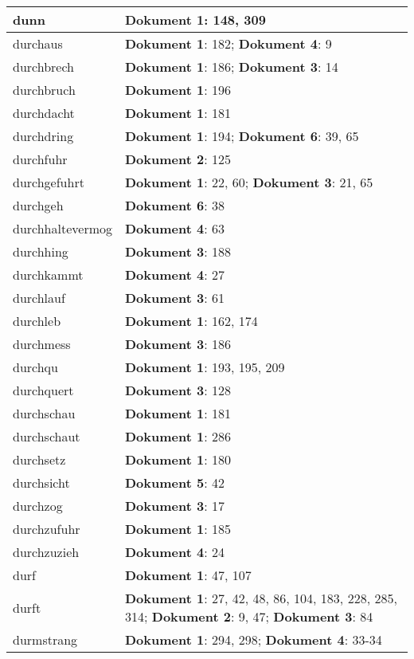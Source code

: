 \documentclass[a5paper]{article}
\begin{document}
\begin{longtable}[l]{|l|p{3in}|}
\hline
dunn & \textbf{Dokument 1}: 148, 309 \\
\hline
durchaus & \textbf{Dokument 1}: 182; \textbf{Dokument 4}: 9 \\
\hline
durchbrech & \textbf{Dokument 1}: 186; \textbf{Dokument 3}: 14 \\
\hline
durchbruch & \textbf{Dokument 1}: 196 \\
\hline
durchdacht & \textbf{Dokument 1}: 181 \\
\hline
durchdring & \textbf{Dokument 1}: 194; \textbf{Dokument 6}: 39, 65 \\
\hline
durchfuhr & \textbf{Dokument 2}: 125 \\
\hline
durchgefuhrt & \textbf{Dokument 1}: 22, 60; \textbf{Dokument 3}: 21, 65 \\
\hline
durchgeh & \textbf{Dokument 6}: 38 \\
\hline
durchhaltevermog & \textbf{Dokument 4}: 63 \\
\hline
durchhing & \textbf{Dokument 3}: 188 \\
\hline
durchkammt & \textbf{Dokument 4}: 27 \\
\hline
durchlauf & \textbf{Dokument 3}: 61 \\
\hline
durchleb & \textbf{Dokument 1}: 162, 174 \\
\hline
durchmess & \textbf{Dokument 3}: 186 \\
\hline
durchqu & \textbf{Dokument 1}: 193, 195, 209 \\
\hline
durchquert & \textbf{Dokument 3}: 128 \\
\hline
durchschau & \textbf{Dokument 1}: 181 \\
\hline
durchschaut & \textbf{Dokument 1}: 286 \\
\hline
durchsetz & \textbf{Dokument 1}: 180 \\
\hline
durchsicht & \textbf{Dokument 5}: 42 \\
\hline
durchzog & \textbf{Dokument 3}: 17 \\
\hline
durchzufuhr & \textbf{Dokument 1}: 185 \\
\hline
durchzuzieh & \textbf{Dokument 4}: 24 \\
\hline
durf & \textbf{Dokument 1}: 47, 107 \\
\hline
durft & \textbf{Dokument 1}: 27, 42, 48, 86, 104, 183, 228, 285, 314; \textbf{Dokument 2}: 9, 47; \textbf{Dokument 3}: 84 \\
\hline
durmstrang & \textbf{Dokument 1}: 294, 298; \textbf{Dokument 4}: 33-34 \\

\end{longtable}
\end{document}
